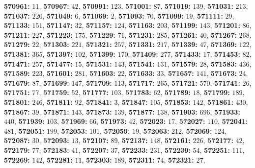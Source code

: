 \textsf{\bfseries 570961:} $11$, \textsf{\bfseries 570967:} $42$, \textsf{\bfseries 570991:} $123$, \textsf{\bfseries 571001:} $87$, \textsf{\bfseries 571019:} $139$, \textsf{\bfseries 571031:} $213$, \textsf{\bfseries 571037:} $220$, \textsf{\bfseries 571049:} $6$, \textsf{\bfseries 571069:} $2$, \textsf{\bfseries 571093:} $70$, \textsf{\bfseries 571099:} $19$, \textsf{\bfseries 571111:} $29$, \textsf{\bfseries 571133:} $151$, \textsf{\bfseries 571147:} $32$, \textsf{\bfseries 571157:} $124$, \textsf{\bfseries 571163:} $203$, \textsf{\bfseries 571199:} $143$, \textsf{\bfseries 571201:} $86$, \textsf{\bfseries 571211:} $227$, \textsf{\bfseries 571223:} $175$, \textsf{\bfseries 571229:} $71$, \textsf{\bfseries 571231:} $285$, \textsf{\bfseries 571261:} $40$, \textsf{\bfseries 571267:} $268$, \textsf{\bfseries 571279:} $22$, \textsf{\bfseries 571303:} $221$, \textsf{\bfseries 571321:} $257$, \textsf{\bfseries 571331:} $217$, \textsf{\bfseries 571339:} $47$, \textsf{\bfseries 571369:} $122$, \textsf{\bfseries 571381:} $365$, \textsf{\bfseries 571397:} $102$, \textsf{\bfseries 571399:} $170$, \textsf{\bfseries 571409:} $277$, \textsf{\bfseries 571433:} $17$, \textsf{\bfseries 571453:} $82$, \textsf{\bfseries 571471:} $257$, \textsf{\bfseries 571477:} $15$, \textsf{\bfseries 571531:} $143$, \textsf{\bfseries 571541:} $131$, \textsf{\bfseries 571579:} $28$, \textsf{\bfseries 571583:} $436$, \textsf{\bfseries 571589:} $223$, \textsf{\bfseries 571601:} $281$, \textsf{\bfseries 571603:} $22$, \textsf{\bfseries 571633:} $33$, \textsf{\bfseries 571657:} $141$, \textsf{\bfseries 571673:} $24$, \textsf{\bfseries 571679:} $87$, \textsf{\bfseries 571699:} $147$, \textsf{\bfseries 571709:} $113$, \textsf{\bfseries 571717:} $265$, \textsf{\bfseries 571721:} $570$, \textsf{\bfseries 571741:} $26$, \textsf{\bfseries 571751:} $77$, \textsf{\bfseries 571759:} $52$, \textsf{\bfseries 571777:} $103$, \textsf{\bfseries 571783:} $62$, \textsf{\bfseries 571789:} $18$, \textsf{\bfseries 571799:} $189$, \textsf{\bfseries 571801:} $246$, \textsf{\bfseries 571811:} $92$, \textsf{\bfseries 571841:} $3$, \textsf{\bfseries 571847:} $105$, \textsf{\bfseries 571853:} $142$, \textsf{\bfseries 571861:} $430$, \textsf{\bfseries 571867:} $39$, \textsf{\bfseries 571871:} $143$, \textsf{\bfseries 571873:} $139$, \textsf{\bfseries 571877:} $138$, \textsf{\bfseries 571903:} $696$, \textsf{\bfseries 571933:} $440$, \textsf{\bfseries 571939:} $103$, \textsf{\bfseries 571969:} $66$, \textsf{\bfseries 571973:} $42$, \textsf{\bfseries 572023:} $17$, \textsf{\bfseries 572027:} $110$, \textsf{\bfseries 572041:} $481$, \textsf{\bfseries 572051:} $199$, \textsf{\bfseries 572053:} $101$, \textsf{\bfseries 572059:} $19$, \textsf{\bfseries 572063:} $212$, \textsf{\bfseries 572069:} $124$, \textsf{\bfseries 572087:} $30$, \textsf{\bfseries 572093:} $13$, \textsf{\bfseries 572107:} $89$, \textsf{\bfseries 572137:} $148$, \textsf{\bfseries 572161:} $226$, \textsf{\bfseries 572177:} $42$, \textsf{\bfseries 572179:} $77$, \textsf{\bfseries 572183:} $41$, \textsf{\bfseries 572207:} $37$, \textsf{\bfseries 572233:} $231$, \textsf{\bfseries 572239:} $54$, \textsf{\bfseries 572251:} $111$, \textsf{\bfseries 572269:} $142$, \textsf{\bfseries 572281:} $11$, \textsf{\bfseries 572303:} $189$, \textsf{\bfseries 572311:} $74$, \textsf{\bfseries 572321:} $27$, 
